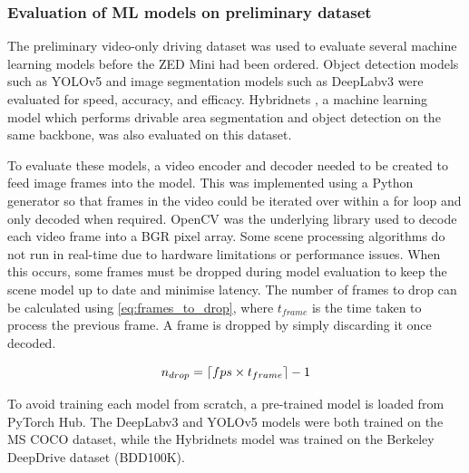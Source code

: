 \subsubsection{Evaluation of ML models on preliminary dataset}
The preliminary video-only driving dataset was used to evaluate
several machine learning models before the ZED Mini had been ordered.
Object detection models such as YOLOv5 \cite{ultralyticsYOLOv5} and image segmentation models such as
DeepLabv3 \cite{chenRethinkingAtrousConvolution2017} were evaluated for speed, accuracy, and efficacy.
Hybridnets \cite{vuHybridNetsEndtoEndPerception2022}, a machine learning model which
performs drivable area segmentation and object detection on the same backbone, was also evaluated on
this dataset.

To evaluate these models, a video encoder and decoder needed to be created
to feed image frames into the model. This was implemented using a Python generator
so that frames in the video could be iterated over within a for loop and only decoded
when required. OpenCV \cite{bradskiOpenCVLibrary2000} was the underlying library used
to decode each video frame into a BGR pixel array.
Some scene processing algorithms do not run in real-time due to hardware limitations or performance issues.
When this occurs, some frames must be dropped during model evaluation to keep the scene model up to date and minimise latency.
The number of frames to drop can be calculated using \cref{eq:frames_to_drop},
where $t_{frame}$ is the time taken to process the previous frame.
A frame is dropped by simply discarding it once decoded.

\begin{equation}
n_{drop} = \lceil fps\times t_{frame}\rceil - 1
\label{eq:frames_to_drop}
\end{equation}

To avoid training each model from scratch, a pre-trained model is loaded from PyTorch Hub.
The DeepLabv3 and YOLOv5 models were both trained on the MS COCO \cite{linMicrosoftCOCOCommon2014} dataset,
while the Hybridnets model was trained on the Berkeley DeepDrive dataset \cite{yuBDD100KDiverseDriving2018} (BDD100K).


